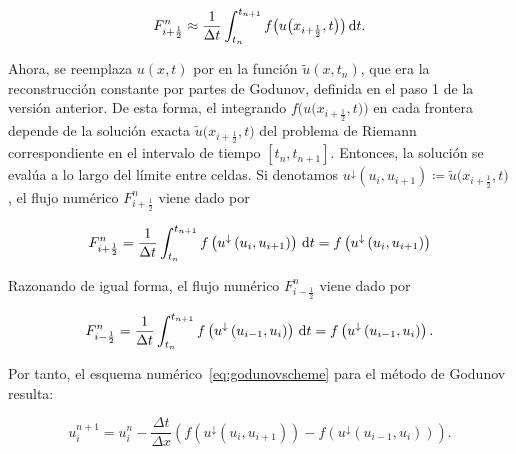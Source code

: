 \begin{equation*}
  F^{n}_{i+\frac{1}{2}}\approx
  \frac{1}{\Delta t}
  \int_{t_{n}}^{t_{n+1}}
  f
  \big(
  u\big(x_{i+\frac{1}{2}},t\big)
  \big)
  \dl t.
\end{equation*}

Ahora, se reemplaza $u\left(x,t\right)$ por en la función
$\widetilde{u}\left(x,t_{n}\right)$, que era la reconstrucción
constante por partes de Godunov, definida en el paso 1 de la versión
anterior.
De esta forma, el integrando
\begin{math}
  f
  \big(
  u
  \big(
    x_{i+\frac{1}{2}},
    t
    \big)
  \big)
\end{math}
en cada frontera depende de la solución exacta
\begin{math}
  \widetilde{u}
  \big(
  x_{i+\frac{1}{2}},t
  \big)
\end{math}
del problema de Riemann correspondiente en el intervalo de tiempo
\begin{math}
  \left[
    t_{n},
    t_{n+1}
    \right]
\end{math}.
Entonces, la solución se evalúa a lo largo del límite entre celdas.
Si denotamos
\begin{math}
  u^{\downarrow}
  \left(u_{i},u_{i+1}\right)\coloneqq
  \widetilde{u}
  \big(
  x_{i+\frac{1}{2}},
  t
  \big)
\end{math},
el flujo numérico $F^{n}_{i+\frac{1}{2}}$ viene dado por

\begin{equation}\label{eq:godunovfluxright}
  F^{n}_{i+\frac{1}{2}}=
  \frac{1}{\Delta t}
  \int_{t_{n}}^{t_{n+1}}
  f
  \left(
  u^{\downarrow}
  \left(u_{i},u_{i+1}\right)
  \right)
  \dl t=
  f
  \left(
  u^{\downarrow}
  \left(u_{i},u_{i+1}\right)
  \right)
\end{equation}

Razonando de igual forma, el flujo numérico $F^{n}_{i-\frac{1}{2}}$
viene dado por

\begin{equation}\label{eq:godunovfluxleft}
  F_{i-\frac{1}{2}}^{n}=
  \frac{1}{\Delta t}
  \int_{t_{n}}^{t_{n+1}}
  f
  \left(
  u^{\downarrow}
  \left(u_{i-1},u_{i}\right)
  \right)
  \dl t=
  f
  \left(
  u^{\downarrow}
  \left(u_{i-1},u_{i}\right)
  \right).
\end{equation}

Por tanto, el esquema numérico~\eqref{eq:godunovscheme} para el método de Godunov resulta:

\begin{equation*}
  u^{n+1}_{i}=
  u^{n}_{i}-
  \frac{\Delta t}{\Delta x}
  \left(
  f
  \left(
    u^{\downarrow}
    \left(u_{i},u_{i+1}\right)
    \right)-
  f
  \left(
    u^{\downarrow}
    \left(u_{i-1},u_{i}\right)
    \right)
  \right).
\end{equation*}

